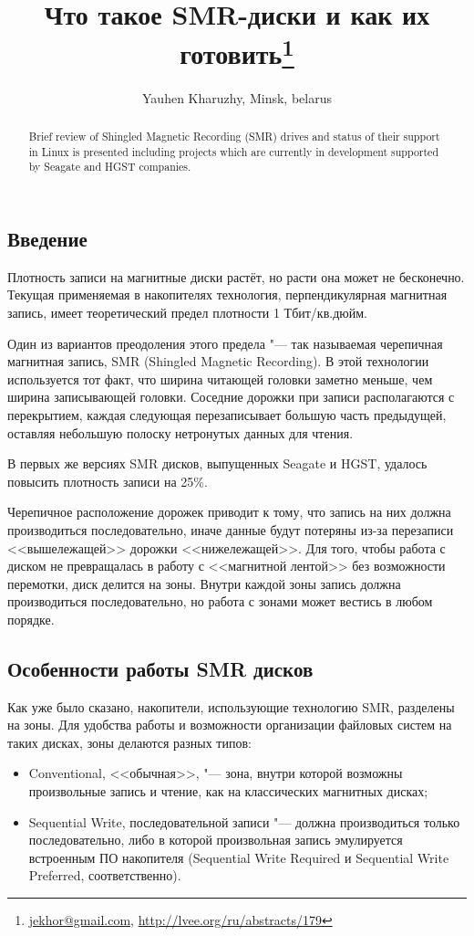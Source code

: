 \documentclass[10pt, a5paper]{article}
\begin{document}
\title{Что такое SMR-диски и как их готовить\footnote{\url{jekhor@gmail.com}, \url{http://lvee.org/ru/abstracts/179}}}
\author{Yauhen Kharuzhy, Minsk, belarus}
\maketitle
\begin{abstract}
Brief review of Shingled Magnetic Recording (SMR) drives and status of their support in Linux is presented including projects which are currently in development supported by Seagate and HGST companies.
\end{abstract}
\subsection*{Введение}

Плотность записи на магнитные диски растёт, но расти она может не бесконечно. Текущая применяемая в накопителях технология, перпендикулярная магнитная запись, имеет теоретический предел плотности 1 Тбит/кв.дюйм.

Один из вариантов преодоления этого предела "--- так называемая черепичная магнитная запись, SMR (Shingled Magnetic \linebreak Recording). В этой технологии используется тот факт, что ширина читающей головки заметно меньше, чем ширина записывающей головки. Соседние дорожки при записи располагаются с перекрытием, каждая следующая перезаписывает большую часть предыдущей, оставляя небольшую полоску нетронутых данных для чтения.

В первых же версиях SMR дисков, выпущенных Seagate и HGST, удалось повысить плотность записи на 25\%.

Черепичное расположение дорожек приводит к тому, что запись на них должна производиться последовательно, иначе данные будут потеряны из-за перезаписи <<вышележащей>> дорожки <<нижележащей>>. Для того, чтобы работа с диском не превращалась в работу с <<магнитной лентой>> без возможности перемотки, диск делится на зоны. Внутри каждой зоны запись должна производиться последовательно, но работа с зонами может вестись в любом порядке.

\subsection*{Особенности работы SMR дисков}

Как уже было сказано, накопители, использующие технологию SMR, разделены на зоны. Для удобства работы и возможности организации файловых систем на таких дисках, зоны делаются разных типов:
\begin{itemize}
  \item Conventional, <<обычная>>, "--- зона, внутри которой возможны произвольные запись и чтение, как на классических магнитных дисках;
  \item Sequential Write, последовательной записи "--- должна производиться только последовательно, либо в которой произвольная запись эмулируется встроенным ПО накопителя (Sequential Write Required и Sequential Write Preferred, соответственно).
\end{itemize}
\end{document}
